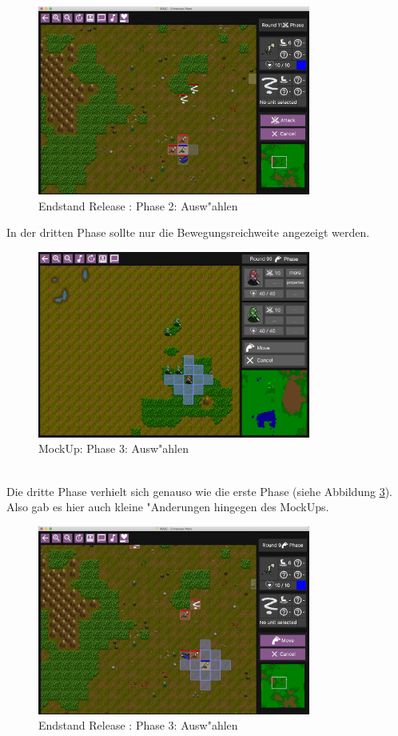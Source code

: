 \documentclass[12pt, titlepage]{scrartcl}
\newcommand{\RN}[1]{%
	\textup{\uppercase\expandafter{\romannumeral#1}}%
}
\newcounter{subsubsubsection}[subsubsection]
\begin{document}
					\begin{figure}[H] 
						\centering
						\includegraphics[width=0.8\textwidth]{images/endOfRelease/Select3.png}
						\caption{Endstand Release \RN{3}: Phase 2: Ausw"ahlen}
						\label{End_Select_2}
					\end{figure}
					In der dritten Phase sollte nur die Bewegungsreichweite angezeigt werden.
					\begin{figure}[H] 
						\centering
						\includegraphics[width=0.8\textwidth]{images/mockUps/Select2.png}
						\caption{MockUp: Phase 3: Ausw"ahlen}
						\label{Select_3_2}
					\end{figure}
					\ \\ Die dritte Phase verhielt sich genauso wie die erste Phase (siehe Abbildung \ref{End_Select_3_2}). Also gab es hier auch kleine "Anderungen hingegen des MockUps.
					\begin{figure}[H] 
						\centering
						\includegraphics[width=0.8\textwidth]{images/endOfRelease/Select2.png}
						\caption{Endstand Release \RN{3}: Phase 3: Ausw"ahlen}
						\label{End_Select_3_2}
					\end{figure} 
\end{document}

